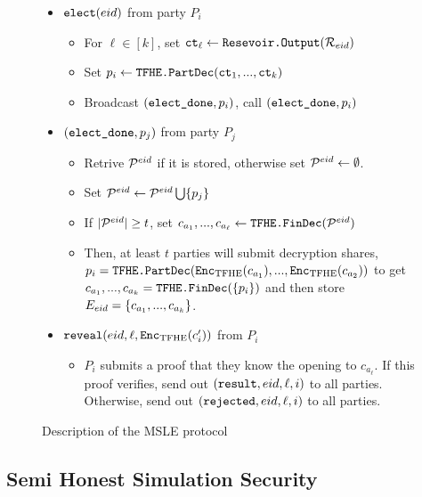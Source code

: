 \begin{figure}
{\begin{minipage}{1\textwidth}
\begin{itemize}
				\item $\texttt{elect}({eid})$ from party $P_i$
				      \begin{itemize}
								\item For $\ell \in [k]$, set $\texttt{ct}_{\ell} \gets \texttt{Resevoir.Output}(\mathcal{R}_{eid})$
								\item Set $p_i \gets \texttt{TFHE.PartDec}(\texttt{ct}_1, ..., \texttt{ct}_k)$
								\item Broadcast $(\texttt{elect\_done}, p_i)$, call $(\texttt{elect\_done}, p_i)$
							\end{itemize}
				\item $(\texttt{elect\_done}, p_j)$ from party $P_j$
							\begin{itemize}
								\item Retrive $\mathcal{P}^{eid}$ if it is stored, otherwise set $\mathcal{P}^{eid} \gets \emptyset$.
								\item Set $\mathcal{P}^{eid} \gets \mathcal{P}^{eid} \bigcup \{p_j\}$
								\item If $|\mathcal{P}^{eid}| \geq t$, set $c_{a_1}, ..., c_{a_\ell} \gets \texttt{TFHE.FinDec}(\mathcal{P}^{eid})$
					      \item Then, at least $t$ parties will submit decryption shares, $p_i = \texttt{TFHE.PartDec}(\texttt{Enc}_{\mathrm{TFHE}}(c_{a_1}), ..., \texttt{Enc}_{\mathrm{TFHE}}(c_{a_2}))$ to get $c_{a_1}, ..., c_{a_k} = \texttt{TFHE.FinDec}(\{p_i\})$ and then
					      store $E_{eid} = \left\{c_{a_1}, ..., c_{a_k}\right\}$.
				      \end{itemize}
				\item $\texttt{reveal}({eid}, \ell, \texttt{Enc}_{\mathrm{TFHE}}(c'_i))$ from $P_i$
				      \begin{itemize}
					      \item $P_i$ submits a proof that they know the opening to $c_{a_\ell}$.
					            If this proof verifies, send out $(\texttt{result}, {eid}, \ell, i)$ to all parties.
					            Otherwise, send out $(\texttt{rejected}, {eid}, \ell, i)$ to all parties.
				      \end{itemize}
			\end{itemize}
		\end{minipage}
	}
	\caption{Description of the MSLE protocol}
	\label{fig:protocolMSLE}
\end{figure}


\subsection{Semi Honest Simulation Security}


